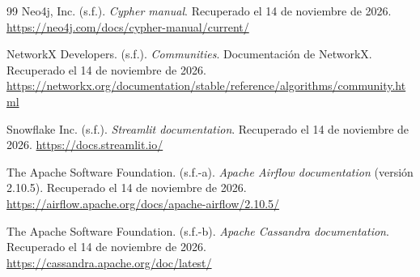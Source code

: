 \documentclass[11pt,a4paper]{article}
\begin{document}
\begin{thebibliography}{99}
Neo4j, Inc. (s.f.).
\textit{Cypher manual}. Recuperado el 14 de noviembre de 2026.
\newline
\url{https://neo4j.com/docs/cypher-manual/current/}

NetworkX Developers. (s.f.).
\textit{Communities}. Documentación de NetworkX. Recuperado el 14 de noviembre de 2026.
\newline
\url{https://networkx.org/documentation/stable/reference/algorithms/community.html}

Snowflake Inc. (s.f.).
\textit{Streamlit documentation}. Recuperado el 14 de noviembre de 2026.
\newline
\url{https://docs.streamlit.io/}

The Apache Software Foundation. (s.f.-a).
\textit{Apache Airflow documentation} (versión 2.10.5). Recuperado el 14 de noviembre de 2026.
\newline
\url{https://airflow.apache.org/docs/apache-airflow/2.10.5/}

The Apache Software Foundation. (s.f.-b).
\textit{Apache Cassandra documentation}. Recuperado el 14 de noviembre de 2026.
\newline
\url{https://cassandra.apache.org/doc/latest/}

\end{thebibliography}
\end{document}
